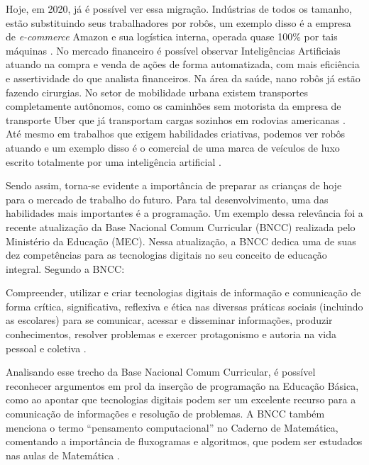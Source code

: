 Hoje, em 2020, já é possível ver essa migração. Indústrias de todos os tamanho, estão substituindo seus trabalhadores por robôs, um exemplo disso é a empresa de \textit{e-commerce} Amazon e sua logística interna, operada quase 100\% por tais máquinas \cite{winick_2018}. No mercado financeiro é possível observar Inteligências Artificiais atuando na compra e venda de ações de forma automatizada, com mais eficiência e assertividade do que analista financeiros. Na área da saúde, nano robôs já estão fazendo cirurgias. No setor de mobilidade urbana existem transportes completamente autônomos, como os caminhões sem motorista da empresa de transporte Uber que já transportam cargas sozinhos em rodovias americanas \cite{demartini_2016}. Até mesmo em trabalhos que exigem habilidades criativas, podemos ver robôs atuando e um exemplo disso é o comercial de uma marca de veículos de luxo escrito totalmente por uma inteligência artificial \cite{autran_2018}.

Sendo assim, torna-se evidente a importância de preparar as crianças de hoje para o mercado de trabalho do futuro. Para tal desenvolvimento, uma das habilidades mais importantes é a programação. Um exemplo dessa relevância foi a recente atualização da Base Nacional Comum Curricular (BNCC) realizada pelo Ministério da Educação (MEC). Nessa atualização, a BNCC dedica uma de suas dez competências para as tecnologias digitais no seu conceito de educação integral. Segundo a BNCC:

\begin{citacao}

Compreender, utilizar e criar tecnologias digitais de informação e comunicação de forma crítica, significativa, reflexiva e ética nas diversas práticas sociais (incluindo as escolares) para se comunicar, acessar e disseminar informações, produzir conhecimentos, resolver problemas e exercer protagonismo e autoria na vida pessoal e coletiva \cite[p. 9]{bncc_2017}.

\end{citacao}

Analisando esse trecho da Base Nacional Comum Curricular, é possível reconhecer argumentos em prol da inserção de programação na Educação Básica, como ao apontar que tecnologias digitais podem ser um excelente recurso para a comunicação de informações e resolução de problemas. A BNCC também menciona o termo “pensamento computacional” no Caderno de Matemática, comentando a importância de fluxogramas e algoritmos, que podem ser estudados nas aulas de Matemática \cite{bncc_2017}.


